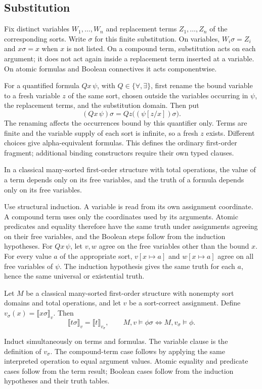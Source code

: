 \subsection{Substitution}
\begin{definition}
Fix distinct variables $W_1,\ldots,W_n$ and replacement terms
$Z_1,\ldots,Z_n$ of the corresponding sorts. Write $\sigma$ for this
finite substitution. On variables, $W_i\sigma=Z_i$ and $x\sigma=x$
when $x$ is not listed. On a compound term, substitution acts on each
argument; it does not act again inside a replacement term inserted at a
variable. On atomic formulas and Boolean connectives it acts componentwise.

For a quantified formula $Qx\,\psi$, with $Q\in\{\forall,\exists\}$,
first rename the bound variable to a fresh variable $z$ of the same sort,
chosen outside the variables occurring in $\psi$, the replacement terms,
and the substitution domain. Then put
\[
(Qx\,\psi)\sigma=Qz\bigl((\psi[z/x])\sigma\bigr).
\]
The renaming affects the occurrences bound by this quantifier only.
Terms are finite and the variable supply of each sort is infinite, so a
fresh $z$ exists. Different choices give alpha-equivalent formulas.
This defines the ordinary first-order fragment; additional binding
constructors require their own typed clauses.
\end{definition}

\begin{lemma}
In a classical many-sorted first-order structure with total operations,
the value of a term depends only on its free variables, and the truth
of a formula depends only on its free variables.
\end{lemma}
\Proof
Use structural induction. A variable is read from its own assignment
coordinate. A compound term uses only the coordinates used by its
arguments. Atomic predicates and equality therefore have the same truth
under assignments agreeing on their free variables, and the Boolean
steps follow from the induction hypotheses. For $Qx\,\psi$, let $v,w$
agree on the free variables other than the bound $x$. For every value
$a$ of the appropriate sort, $v[x\mapsto a]$ and $w[x\mapsto a]$ agree
on all free variables of $\psi$. The induction hypothesis gives the
same truth for each $a$, hence the same universal or existential truth.
\Done

\begin{lemma}
\label{lem:classical_substitution_evaluation}
Let $M$ be a classical many-sorted first-order structure with nonempty
sort domains and total operations, and let $v$ be a sort-correct assignment.
Define $v_\sigma(x)=\llbracket x\sigma\rrbracket_v$. Then
\[
\llbracket t\sigma\rrbracket_v=\llbracket t\rrbracket_{v_\sigma},
\qquad
M,v\models\phi\sigma\iff M,v_\sigma\models\phi.
\]
\end{lemma}
\Proof
Induct simultaneously on terms and formulas. The variable clause is the
definition of $v_\sigma$. The compound-term case follows by applying the
same interpreted operation to equal argument values. Atomic equality
and predicate cases follow from the term result; Boolean cases follow
from the induction hypotheses and their truth tables.

